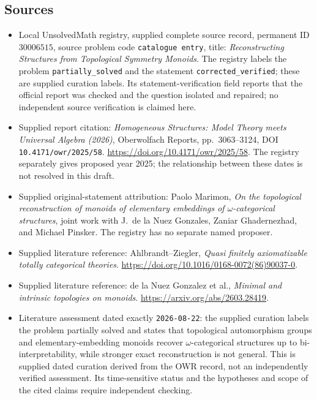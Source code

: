 \documentclass[11pt]{article}
\begin{document}
\subsection{Sources}
\begin{itemize}
\item Local UnsolvedMath registry, supplied complete source record, permanent ID \(30006515\), source problem code \texttt{catalogue entry}, title: \emph{Reconstructing Structures from Topological Symmetry Monoids}. The registry labels the problem \texttt{partially\_solved} and the statement \texttt{corrected\_verified}; these are supplied curation labels. Its statement-verification field reports that the official report was checked and the question isolated and repaired; no independent source verification is claimed here.
\item Supplied report citation: \emph{Homogeneous Structures: Model Theory meets Universal Algebra (2026)}, Oberwolfach Reports, pp.\ 3063--3124, DOI \texttt{10.4171/owr/2025/58}. \url{https://doi.org/10.4171/owr/2025/58}. The registry separately gives proposed year 2025; the relationship between these dates is not resolved in this draft.
\item Supplied original-statement attribution: Paolo Marimon, \emph{On the topological reconstruction of monoids of elementary embeddings of \(\omega\)-categorical structures}, joint work with J.\ de la Nuez Gonzales, Zaniar Ghadernezhad, and Michael Pinsker. The registry has no separate named proposer.
\item Supplied literature reference: Ahlbrandt--Ziegler, \emph{Quasi finitely axiomatizable totally categorical theories}. \url{https://doi.org/10.1016/0168-0072(86)90037-0}.
\item Supplied literature reference: de la Nuez Gonzalez et al., \emph{Minimal and intrinsic topologies on monoids}. \url{https://arxiv.org/abs/2603.28419}.
\item Literature assessment dated exactly \texttt{2026-08-22}: the supplied curation labels the problem partially solved and states that topological automorphism groups and elementary-embedding monoids recover \(\omega\)-categorical structures up to bi-interpretability, while stronger exact reconstruction is not general. This is supplied dated curation derived from the OWR record, not an independently verified assessment. Its time-sensitive status and the hypotheses and scope of the cited claims require independent checking.
\end{itemize}
\end{document}
